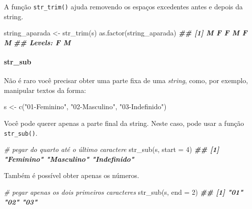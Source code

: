\documentclass[
]{book}
\newenvironment{Shaded}{\begin{snugshade}}{\end{snugshade}}
\newcommand{\AttributeTok}[1]{\textcolor[rgb]{0.77,0.63,0.00}{#1}}
\newcommand{\CommentTok}[1]{\textcolor[rgb]{0.56,0.35,0.01}{\textit{#1}}}
\newcommand{\DecValTok}[1]{\textcolor[rgb]{0.00,0.00,0.81}{#1}}
\newcommand{\DocumentationTok}[1]{\textcolor[rgb]{0.56,0.35,0.01}{\textbf{\textit{#1}}}}
\newcommand{\FunctionTok}[1]{\textcolor[rgb]{0.00,0.00,0.00}{#1}}
\newcommand{\NormalTok}[1]{#1}
\newcommand{\OtherTok}[1]{\textcolor[rgb]{0.56,0.35,0.01}{#1}}
\newcommand{\StringTok}[1]{\textcolor[rgb]{0.31,0.60,0.02}{#1}}
\begin{document}
A função \texttt{str\_trim()} ajuda removendo os espaços excedentes antes e depois da string.

\begin{Shaded}
\begin{Highlighting}[]
\NormalTok{string\_aparada }\OtherTok{\textless{}{-}} \FunctionTok{str\_trim}\NormalTok{(s)}
\FunctionTok{as.factor}\NormalTok{(string\_aparada)}
\DocumentationTok{\#\# [1] M F F M F M}
\DocumentationTok{\#\# Levels: F M}
\end{Highlighting}
\end{Shaded}

\hypertarget{str_sub}{%
\paragraph*{str\_sub}\label{str_sub}}

Não é raro você precisar obter uma parte fixa de uma \emph{string}, como, por exemplo, manipular textos da forma:

\begin{Shaded}
\begin{Highlighting}[]
\NormalTok{s }\OtherTok{\textless{}{-}} \FunctionTok{c}\NormalTok{(}\StringTok{"01{-}Feminino"}\NormalTok{, }\StringTok{"02{-}Masculino"}\NormalTok{, }\StringTok{"03{-}Indefinido"}\NormalTok{)}
\end{Highlighting}
\end{Shaded}

Você pode querer apenas a parte final da string. Neste caso, pode usar a função \texttt{str\_sub()}.

\begin{Shaded}
\begin{Highlighting}[]
\CommentTok{\# pegar do quarto até o último caractere}
\FunctionTok{str\_sub}\NormalTok{(s, }\AttributeTok{start =} \DecValTok{4}\NormalTok{) }
\DocumentationTok{\#\# [1] "Feminino"   "Masculino"  "Indefinido"}
\end{Highlighting}
\end{Shaded}

Também é possível obter apenas os números.

\begin{Shaded}
\begin{Highlighting}[]
\CommentTok{\# pegar apenas os dois primeiros caracteres}
\FunctionTok{str\_sub}\NormalTok{(s, }\AttributeTok{end =} \DecValTok{2}\NormalTok{) }
\DocumentationTok{\#\# [1] "01" "02" "03"}
\end{Highlighting}
\end{Shaded}
\end{document}
